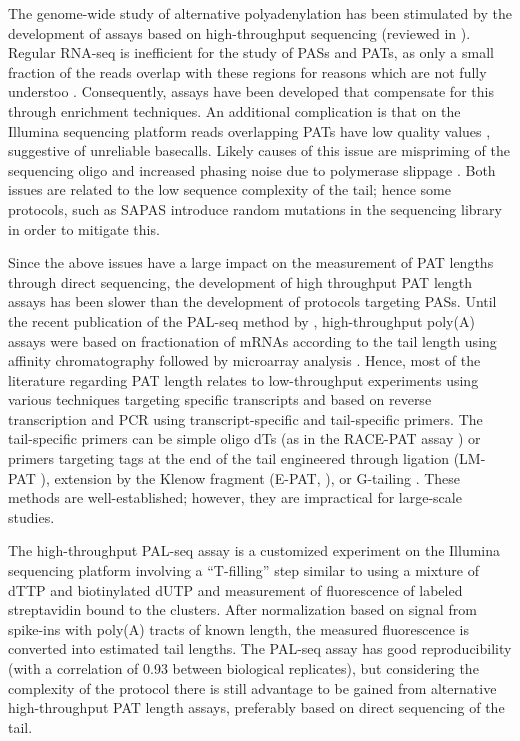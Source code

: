 \documentclass[10pt]{article}
\begin{document}
The genome-wide study of alternative polyadenylation has been stimulated by the development of assays based on high-throughput sequencing (reviewed in \cite{elkon13}). Regular RNA-seq is inefficient for the study of PASs and PATs, as only a small fraction of the reads overlap with these regions for reasons which are not fully understoo \cite{fu11,wilkening13}. Consequently, assays have been developed that compensate for this through enrichment techniques. An additional complication is that on the Illumina sequencing platform reads overlapping PATs have low quality values \cite{wilkening13}, suggestive of unreliable basecalls. Likely causes of this issue are mispriming of the sequencing oligo and increased phasing noise due to polymerase slippage \cite{wilkening13}. Both issues are related to the low sequence complexity of the tail; hence some protocols, such as SAPAS \cite{fu11} introduce random mutations in the sequencing library in order to mitigate this.

Since the above issues have a large impact on the measurement of PAT lengths through direct sequencing, the development of high throughput PAT length assays has been slower than the development of protocols targeting PASs. Until the recent publication of the PAL-seq method by \cite{subtelny14}, high-throughput poly(A) assays were based on fractionation of mRNAs according to the tail length using affinity chromatography followed by microarray analysis \cite{beilharz07,meijer07}. Hence, most of the literature regarding PAT length relates to low-throughput experiments using various techniques targeting specific transcripts \cite{salles95} and based on reverse transcription and PCR using transcript-specific and tail-specific primers. The tail-specific primers can be simple oligo dTs (as in the RACE-PAT assay \cite{salles95}) or primers targeting tags at the end of the tail engineered through ligation (LM-PAT \cite{salles95}), extension by the Klenow fragment (E-PAT, \cite{janicke12}), or G-tailing \cite{kusov01}. These methods are well-established; however, they are impractical for large-scale studies.

The high-throughput PAL-seq assay \cite{subtelny14} is a customized experiment on the Illumina sequencing platform involving a ``T-filling'' step similar to \cite{wilkening13} using a mixture of dTTP and biotinylated dUTP and measurement of fluorescence of labeled streptavidin bound to the clusters. After normalization based on signal from spike-ins with poly(A) tracts of known length, the measured fluorescence is converted into estimated tail lengths. The PAL-seq assay has good reproducibility (with a correlation of 0.93 between biological replicates), but considering the complexity of the protocol there is still advantage to be gained from alternative high-throughput PAT length assays, preferably based on direct sequencing of the tail.
\end{document}
